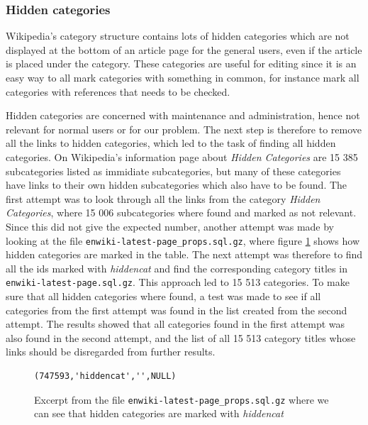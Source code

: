 \subsubsection{Hidden categories}
Wikipedia's category structure contains lots of hidden categories which are not displayed at the bottom of an article page for the general users, even if the article is placed under the category. These categories are useful for editing since it is an easy way to all mark categories with something in common, for instance mark all categories with references that needs to be checked. 

Hidden categories are concerned with maintenance and administration, hence not relevant for normal users or for our problem. The next step is therefore to remove all the links to hidden categories, which led to the task of finding all hidden categories. On Wikipedia's information page about \emph{Hidden Categories}\cite{wiki:hiddencat} are 15 385 subcategories listed as immidiate subcategories, but many of these categories have links to their own hidden subcategories which also have to be found. The first attempt was to look through all the links from the category \emph{Hidden Categories}, where 15 006 subcategories where found and marked as not relevant. Since this did not give the expected number, another attempt was made by looking at the file \texttt{enwiki-latest-page\_props.sql.gz}, where figure \ref{fig:pageprops} shows how  hidden categories are marked in the table. The next attempt was therefore to find all the ids marked with \emph{hiddencat} and find the corresponding category titles in \texttt{enwiki-latest-page.sql.gz}. This approach led to 15 513 categories. To make sure that all hidden categories where found, a test was made to see if all categories from the first attempt was found in the list created from the second attempt. The results showed that all categories found in the first attempt was also found in the second attempt, and the list of all 15 513 category titles whose links should be disregarded from further results. 

\begin{figure}[h]
\centering
\begin{lstlisting}
(747593,'hiddencat','',NULL)
\end{lstlisting}
\caption[Insert statement for hidden category]{Excerpt from the file \texttt{enwiki-latest-page\_props.sql.gz} where we can see that hidden categories are marked with \emph{hiddencat}}
\label{fig:pageprops}
\end{figure}

